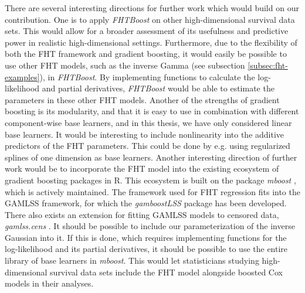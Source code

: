 There are several interesting directions for further work which would build on our contribution.
One is to apply \textit{FHTBoost} on other high-dimensional survival data sets.
This would allow for a broader assessment of its usefulness and predictive power in realistic high-dimensional settings.
Furthermore, due to the flexibility of both the FHT framework and gradient boosting, it would easily be possible to use other FHT models, such as the inverse Gamma (see subsection \ref{subsec:fht-examples}), in \textit{FHTBoost}.
By implementing functions to calculate the log-likelihood and partial derivatives, \textit{FHTBoost} would be able to estimate the parameters in these other FHT models.
Another of the strengths of gradient boosting is its modularity, and that it is easy to use in combination with different component-wise base learners, and in this thesis, we have only considered linear base learners.
It would be interesting to include nonlinearity into the additive predictors of the FHT parameters.
This could be done by e.g. using regularized splines of one dimension as base learners.
Another interesting direction of further work would be to incorporate the FHT model into the existing ecosystem of gradient boosting packages in R.
This ecosystem is built on the package \textit{mboost} \citep{mboost}, which is actively maintained.
The framework used for FHT regression fits into the GAMLSS \citep{gamlss} framework, for which the \textit{gamboostLSS} package \citep{gamboostlss-paper, gamboostLSS-manual} has been developed.
There also exists an extension for fitting GAMLSS models to censored data, \textit{gamlss.cens} \citep{gamlsscens}.
It should be possible to include our parameterization of the inverse Gaussian into it.
If this is done, which requires implementing functions for the log-likelihood and its partial derivatives, it should be possible to use the entire library of base learners in \textit{mboost}.
This would let statisticians studying high-dimensional survival data sets include the FHT model alongside boosted Cox models in their analyses.
